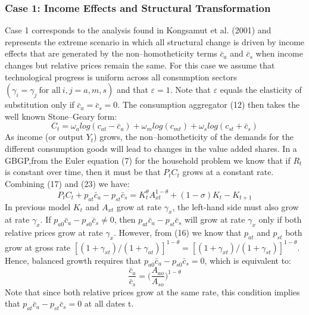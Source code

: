 \documentclass{article}
\begin{document}
    \subsubsection{Case 1: Income Effects and Structural Transformation}
    Case 1 corresponds to the analysis found in Kongsamut et al. (2001) and represents the extreme scenario in which all structural change is driven by income effects that are generated by the non–homotheticity terms $\bar{c}_a$ and $\bar{c}_s$ when income changes but relative prices remain the same. For this case we assume that technological progress is uniform across all consumption sectors $(\gamma_i = \gamma_j\ \text{for all}\ i, j = a, m, s)$ and that $\varepsilon =1$. Note that $\varepsilon$ equals the elasticity of substitution only if $\bar{c}_a=\bar{c}_s=0$. The consumption aggregator (12) then takes the well known Stone–Geary form:
    \begin{equation}
        C_t=\omega_a log(c_{at}-\bar{c}_a) + \omega_m log(c_{mt}) + \omega_s log(c_{st}+\bar{c}_s)
    \end{equation}
    As income (or output $Y_t$) grows, the non–homotheticity of the demands for the different consumption goods will lead to changes in the value added shares. In a GBGP,from the Euler equation (7) for the household problem we know that if $R_t$ is constant over time, then it must be that $P_tC_t$ grows at a constant rate. Combining (17) and (23) we have:
    \begin{equation}
        P_tC_t+p_{at}\bar{c}_a-p_{st}\bar{c}_s=K_t^\theta A_{xt}^{1-\theta} + (1-\sigma)K_t-K_{t+1}
    \end{equation}
    In previous model $K_t$ and $A_{xt}$ grow at rate $\gamma_x$, the left-hand side must also grow at rate $\gamma_x$. If $p_{a0}\bar{c}_a-p_{s0}\bar{c}_s \neq 0$, then $p_{at}\bar{c}_a-p_{st}\bar{c}_s$ will grow at rate $\gamma_x$ only if both relative prices grow at rate $\gamma_x$. However, from (16) we know that $p_{at}$ and $p_{st}$ both grow at gross rate $[(1+\gamma_{xt})/(1+\gamma_{at})]^{1-\theta}=[(1+\gamma_{xt})/(1+\gamma_{st})]^{1-\theta}$. Hence, balanced growth requires that $p_{a0}\bar{c}_a-p_{s0}\bar{c}_s=0$, which is equivalent to:
    \begin{equation}
        \frac{\bar{c}_a}{\bar{c}_s}=\biggl( \frac{A_{ao}}{A_{so}} \biggr)^{1-\theta}
    \end{equation}
    Note that since both relative prices grow at the same rate, this condition implies that $p_{at}\bar{c}_a-p_{st}\bar{c}_s = 0$ at all dates t.
\end{document}
